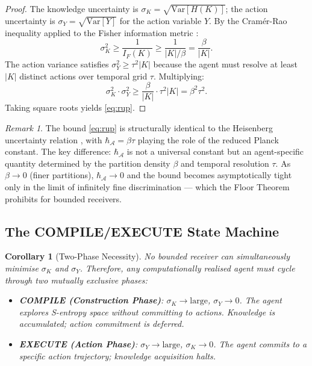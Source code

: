 \documentclass[twocolumn,11pt,a4paper]{article}
\theoremstyle{plain}
\newtheorem{corollary}[theorem]{Corollary}
\theoremstyle{definition}
\theoremstyle{remark}
\newtheorem{remark}[theorem]{Remark}
\newcommand{\abs}[1]{\left|#1\right|}
\begin{document}
\begin{proof}
The knowledge uncertainty is $\sigma_K = \sqrt{\mathrm{Var}[H(K)]}$; the action uncertainty is $\sigma_Y = \sqrt{\mathrm{Var}[Y]}$ for the action variable $Y$.  By the Cram\'er-Rao inequality applied to the Fisher information metric \citep{fisher1925,coverthomas2006}:
\begin{equation}
  \sigma_K^2 \ge \frac{1}{I_F(K)} \ge \frac{1}{\abs{K}/\beta} = \frac{\beta}{\abs{K}}.
\end{equation}
The action variance satisfies $\sigma_Y^2 \ge \tau^2\abs{K}$ because the agent must resolve at least $\abs{K}$ distinct actions over temporal grid $\tau$.  Multiplying:
\begin{equation}
  \sigma_K^2\cdot\sigma_Y^2 \ge \frac{\beta}{\abs{K}}\cdot\tau^2\abs{K} = \beta^2\tau^2.
\end{equation}
Taking square roots yields \eqref{eq:rup}.
\end{proof}

\begin{remark}
The bound \eqref{eq:rup} is structurally identical to the Heisenberg uncertainty relation \citep{heisenberg1927}, with $\hbar_{\mathcal{A}} = \beta\tau$ playing the role of the reduced Planck constant.  The key difference: $\hbar_{\mathcal{A}}$ is not a universal constant but an agent-specific quantity determined by the partition density $\beta$ and temporal resolution $\tau$.  As $\beta \to 0$ (finer partitions), $\hbar_{\mathcal{A}} \to 0$ and the bound becomes asymptotically tight only in the limit of infinitely fine discrimination — which the Floor Theorem prohibits for bounded receivers.
\end{remark}

\subsection{The COMPILE/EXECUTE State Machine}

\begin{corollary}[Two-Phase Necessity]
\label{cor:twophase}
No bounded receiver can simultaneously minimise $\sigma_K$ and $\sigma_Y$.  Therefore, any computationally realised agent must cycle through two mutually exclusive phases:
\begin{itemize}
  \item \textbf{COMPILE (Construction Phase)}: $\sigma_K \to \text{large}$, $\sigma_Y \to 0$.  The agent explores S-entropy space without committing to actions.  Knowledge is accumulated; action commitment is deferred.
  \item \textbf{EXECUTE (Action Phase)}: $\sigma_Y \to \text{large}$, $\sigma_K \to 0$.  The agent commits to a specific action trajectory; knowledge acquisition halts.
\end{itemize}
\end{corollary}
\end{document}
